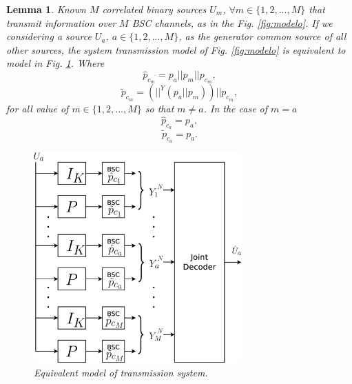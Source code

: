 \documentclass[journal]{IEEEtran}
\newtheorem{lemma}[theorem]{Lemma}
\begin{document}
\begin{lemma}
\label{lemma:equivsystemmodel}
Known $M$ correlated binary sources $U_m$, $\forall m \in \{1, 2, ..., M\}$ that
transmit information over $M$ BSC channels, as in the Fig. \ref{fig:modelo}. If 
we considering a source $U_a$, $a \in \{1, 2, ..., M\}$, as the generator common 
source of all other sources, the system transmission model of Fig. \ref{fig:modelo}
is equivalent to model in Fig. \ref{fig:equivchannel}. Where 
\begin{equation} \label{eq:hpctm}
\hat{p}_{c_{m}}=p_a||p_m||p_{c_m},
\end{equation}
\begin{equation} \label{eq:tpctm}
\tilde{p}_{c_{m}}=(||^Y (p_a||p_m))||p_{c_m},
\end{equation}
for all value of $m \in \{1, 2, ..., M \}$ so that $m \neq a$. In the case of 
$m=a$ 
\begin{equation} \label{eq:hpcta}
\hat{p}_{c_{a}}=p_a,
\end{equation}
\begin{equation} \label{eq:tpcta}
\tilde{p}_{c_{a}}=p_a.
\end{equation}
\begin{figure}[h!bt]
\centering
\includegraphics[width=8.0cm]{equiv1.eps}
\caption{Equivalent model of transmission system.} \label{fig:equivchannel}
\end{figure} 
\end{lemma}

\end{document}
